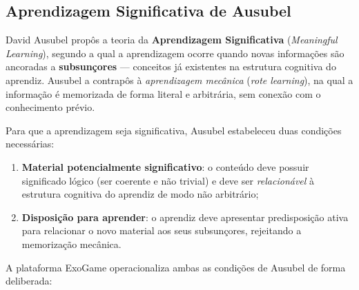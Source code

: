 \documentclass[
	12pt,
	openany,
	oneside,
	a4paper,
	english,
	brazil
]{abntex2}
\begin{document}
\subsection{Aprendizagem Significativa de Ausubel}

David Ausubel \cite{ausubel1968, ausubel2000} propôs a teoria da \textbf{Aprendizagem Significativa} (\textit{Meaningful Learning}), segundo a qual a aprendizagem ocorre quando novas informações são ancoradas a \textbf{subsunçores} --- conceitos já existentes na estrutura cognitiva do aprendiz. Ausubel a contrapôs à \textit{aprendizagem mecânica} (\textit{rote learning}), na qual a informação é memorizada de forma literal e arbitrária, sem conexão com o conhecimento prévio.

Para que a aprendizagem seja significativa, Ausubel estabeleceu duas condições necessárias:

\begin{enumerate}
  \item \textbf{Material potencialmente significativo}: o conteúdo deve possuir significado lógico (ser coerente e não trivial) e deve ser \textit{relacionável} à estrutura cognitiva do aprendiz de modo não arbitrário;
  \item \textbf{Disposição para aprender}: o aprendiz deve apresentar predisposição ativa para relacionar o novo material aos seus subsunçores, rejeitando a memorização mecânica.
\end{enumerate}

A plataforma ExoGame operacionaliza ambas as condições de Ausubel de forma deliberada:
\end{document}
